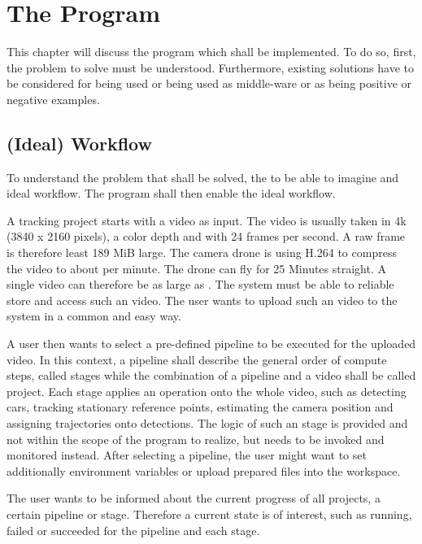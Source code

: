 \chapter{The Program}

This chapter will discuss the program which shall be implemented.
To do so, first, the problem to solve must be understood.
Furthermore, existing solutions have to be considered for being used or being used as middle-ware or as being positive or negative examples.

\section{(Ideal) Workflow}

To understand the problem that shall be solved, the  to be able to imagine and ideal workflow.
The program shall then enable the ideal workflow.


A tracking project starts with a video as input.
The video is usually taken in 4k (3840 x 2160 pixels), a  color depth and with 24 frames per second.
A raw frame is therefore least 189 MiB large.
The camera drone is using H.264 to compress the video to about  per minute.
The drone can fly for 25 Minutes straight.
A single video can therefore be as large as .
The system must be able to reliable store and access such an video.
The user wants to upload such an video to the system in a common and easy way.

A user then wants to select a pre-defined pipeline to be executed for the uploaded video.
In this context, a pipeline shall describe the general order of compute steps, called stages while the combination of a pipeline and a video shall be called project.
Each stage applies an operation onto the whole video, such as detecting cars, tracking stationary reference points, estimating the camera position and assigning trajectories onto detections.
The logic of such an stage is provided and not within the scope of the program to realize, but needs to be invoked and monitored instead.
After selecting a pipeline, the user might want to set additionally environment variables or upload prepared files into the workspace.

The user wants to be informed about the current progress of all projects, a certain pipeline or stage.
Therefore a current state is of interest, such as running, failed or succeeded for the pipeline and each stage.

